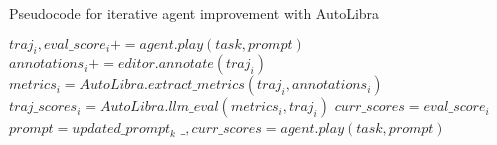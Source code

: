\begin{algorithm}
    \caption{Pseudocode for iterative agent improvement with AutoLibra}
    \begin{algorithmic}[1]
            \State $traj_i, eval\_score_i += agent.play(task, prompt)$
            \State $annotations_i += editor.annotate(traj_i)$
        \EndFor
        \State $metrics_i = AutoLibra.extract\_metrics(traj_i, annotations_i)$
        \State $traj\_scores_i = AutoLibra.llm\_eval(metrics_i, traj_i)$
        \State $curr\_scores = eval\_score_i$
            \State $prompt = updated\_prompt_k$
                \State $\_, curr\_scores = agent.play(task, prompt)$
            \EndFor
        \EndWhile
    \EndFor

    \end{algorithmic}
\end{algorithm}

